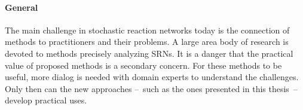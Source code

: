 \paragraph{General}
The main challenge in stochastic reaction networks today is the connection of methods to practitioners and their problems.
A large area body of research is devoted to methods precisely analyzing \acp{SRN}.
It is a danger that the practical value of proposed methods is a secondary concern.
For these methods to be useful, more dialog is needed with domain experts to understand the challenges.
Only then can the new approaches --~such as the ones presented in this thesis~-- develop practical uses.
